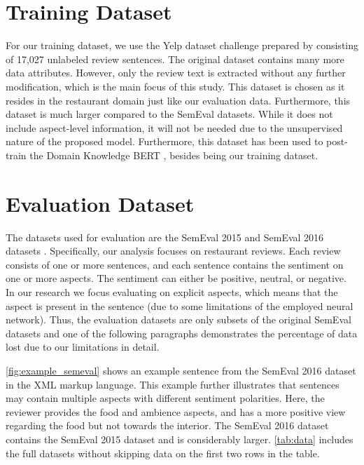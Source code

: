 \documentclass[american, oneside]{ecsgdp}
\begin{document}
\section{Training Dataset} \label{sec:training_data}
For our training dataset, we use the Yelp dataset challenge prepared by \textcite{Huang2020JASen} consisting of 17,027 unlabeled review sentences. The original dataset \parencite{Tang2016Yelp} contains many more data attributes. However, only the review text is extracted without any further modification, which is the main focus of this study. This dataset is chosen as it resides in the restaurant domain just like our evaluation data. Furthermore, this dataset is much larger compared to the SemEval datasets. While it does not include aspect-level information, it will not be needed due to the unsupervised nature of the proposed model. Furthermore, this dataset has been used to post-train the Domain Knowledge BERT \parencite{Xu2019DKBERT}, besides being our training dataset.

\section{Evaluation Dataset} \label{sec:evaluation_data}
The datasets used for evaluation are the SemEval 2015 \parencite{Pontiki2015SemEval} and SemEval 2016 datasets \parencite{Pontiki2016SemEval}. Specifically, our analysis focuses on restaurant reviews. Each review consists of one or more sentences, and each sentence contains the sentiment on one or more aspects. The sentiment can either be positive, neutral, or negative. In our research we focus evaluating on explicit aspects, which means that the aspect is present in the sentence (due to some limitations of the employed neural network). Thus, the evaluation datasets are only subsets of the original SemEval datasets and one of the following paragraphs demonstrates the percentage of data lost due to our limitations in detail. 

\cref{fig:example_semeval} shows an example sentence from the SemEval 2016 dataset in the XML markup language. This example further illustrates that sentences may contain multiple aspects with different sentiment polarities. Here, the reviewer provides the food and ambience aspects, and has a more positive view regarding the food but not towards the interior. The SemEval 2016 dataset contains the SemEval 2015 dataset and is considerably larger. \cref{tab:data} includes the full datasets without skipping data on the first two rows in the table.
\end{document}

